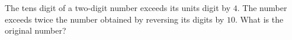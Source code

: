 The tens digit of a two-digit number exceeds its units digit by $4$. The number exceeds twice the number obtained by reversing its digits by $10$. What is the original number?
